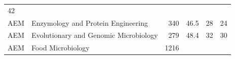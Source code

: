 \documentclass[11pt,]{article}
\begin{document}
\begin{longtable}[]{@{}llrrrr@{}}
\begin{minipage}[t]{0.11\columnwidth}
42\strut
\end{minipage}\tabularnewline
\begin{minipage}[t]{0.06\columnwidth}\raggedright\strut
AEM\strut
\end{minipage} & \begin{minipage}[t]{0.43\columnwidth}\raggedright\strut
Enzymology and Protein Engineering\strut
\end{minipage} & \begin{minipage}[t]{0.04\columnwidth}\raggedleft\strut
340\strut
\end{minipage} & \begin{minipage}[t]{0.08\columnwidth}\raggedleft\strut
46.5\strut
\end{minipage} & \begin{minipage}[t]{0.11\columnwidth}\raggedleft\strut
28\strut
\end{minipage} & \begin{minipage}[t]{0.11\columnwidth}\raggedleft\strut
24\strut
\end{minipage}\tabularnewline
\begin{minipage}[t]{0.06\columnwidth}\raggedright\strut
AEM\strut
\end{minipage} & \begin{minipage}[t]{0.43\columnwidth}\raggedright\strut
Evolutionary and Genomic Microbiology\strut
\end{minipage} & \begin{minipage}[t]{0.04\columnwidth}\raggedleft\strut
279\strut
\end{minipage} & \begin{minipage}[t]{0.08\columnwidth}\raggedleft\strut
48.4\strut
\end{minipage} & \begin{minipage}[t]{0.11\columnwidth}\raggedleft\strut
32\strut
\end{minipage} & \begin{minipage}[t]{0.11\columnwidth}\raggedleft\strut
30\strut
\end{minipage}\tabularnewline
\begin{minipage}[t]{0.06\columnwidth}\raggedright\strut
AEM\strut
\end{minipage} & \begin{minipage}[t]{0.43\columnwidth}\raggedright\strut
Food Microbiology\strut
\end{minipage} & \begin{minipage}[t]{0.04\columnwidth}\raggedleft\strut
1216\strut
\end{minipage} & \begin{minipage}[t]{0.08\columnwidth}\raggedleft\strut

\end{minipage}
\end{longtable}
\end{document}
